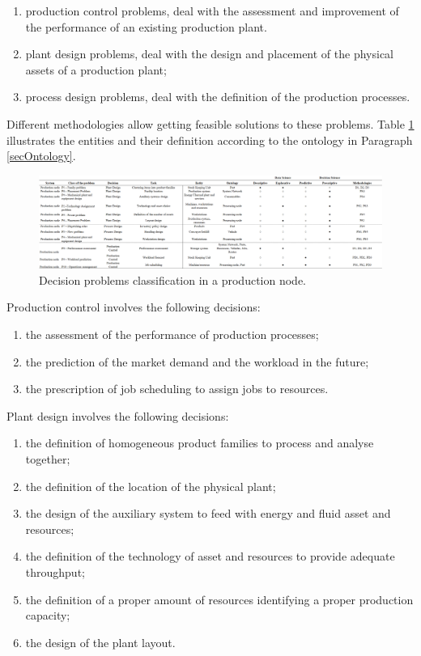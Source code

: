 \begin{enumerate}
    \item production control problems, deal with the assessment and improvement of the performance of an existing production plant.
    \item plant design problems, deal with the design and placement of the physical assets of a production plant;
    \item process design problems, deal with the definition of the production processes.
\end{enumerate}

Different methodologies allow getting feasible solutions to these problems. Table \ref{tab_problems_prod} illustrates the entities and their definition according to the ontology in Paragraph \ref{secOntology}. 

\begin{landscape}
\thispagestyle{empty}
\begin{figure}[hbt!]
\centering
\includegraphics[width=1.5\textwidth]{sectionProduction/diagnosticModels_figures/tab_problems_prod.png}
\captionsetup{type=table}
\caption{Decision problems classification in a production node.}
\label{tab_problems_prod}
\end{figure}
\end{landscape}

Production control involves the following decisions:
\begin{enumerate}
    \item the assessment of the performance of production processes;
    \item the prediction of the market demand and the workload in the future;
    \item the prescription of job scheduling to assign jobs to resources.
\end{enumerate}

Plant design involves the following decisions:
\begin{enumerate}
    \item the definition of homogeneous product families to process and analyse together;
    \item the definition of the location of the physical plant;
    \item the design of the auxiliary system to feed with energy and fluid asset and resources;
    \item the definition of the technology of asset and resources to provide adequate throughput;
    \item the definition of a proper amount of resources identifying a proper production capacity;
    \item the design of the plant layout.

\end{enumerate}

